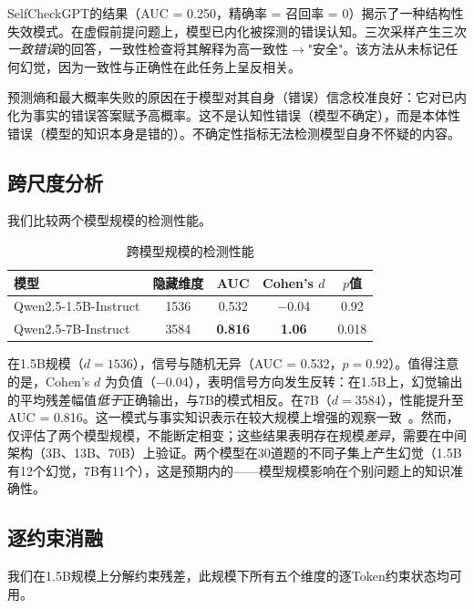 \documentclass[11pt]{ctexart}
\begin{document}
SelfCheckGPT的结果（AUC = 0.250，精确率 = 召回率 = 0）揭示了一种结构性失效模式。在虚假前提问题上，模型已内化被探测的错误认知。三次采样产生三次\textit{一致错误}的回答，一致性检查将其解释为高一致性$\rightarrow$"安全"。该方法从未标记任何幻觉，因为一致性与正确性在此任务上呈反相关。

预测熵和最大概率失败的原因在于模型对其自身（错误）信念校准良好：它对已内化为事实的错误答案赋予高概率。这不是认知性错误（模型不确定），而是本体性错误（模型的知识本身是错的）。不确定性指标无法检测模型自身不怀疑的内容。

\subsection{跨尺度分析}

我们比较两个模型规模的检测性能。

\begin{table}[h]
\centering
\caption{跨模型规模的检测性能}
\label{tab:scale}
\begin{tabular}{lcccc}
\toprule
\textbf{模型} & \textbf{隐藏维度} & \textbf{AUC} & \textbf{Cohen's $d$} & \textbf{$p$值} \\
\midrule
Qwen2.5-1.5B-Instruct & 1536 & 0.532 & $-$0.04 & 0.92 \\
Qwen2.5-7B-Instruct & 3584 & \textbf{0.816} & \textbf{1.06} & 0.018 \\
\bottomrule
\end{tabular}
\end{table}

在1.5B规模（$d = 1536$），信号与随机无异（AUC = 0.532，$p = 0.92$）。值得注意的是，Cohen's $d$ 为负值（$-$0.04），表明信号方向发生反转：在1.5B上，幻觉输出的平均残差幅值\textit{低于}正确输出，与7B的模式相反。在7B（$d = 3584$），性能提升至AUC = 0.816。这一模式与事实知识表示在较大规模上增强的观察一致~\cite{wei2022emergent}。然而，仅评估了两个模型规模，不能断定相变；这些结果表明存在规模\textit{差异}，需要在中间架构（3B、13B、70B）上验证。两个模型在30道题的不同子集上产生幻觉（1.5B有12个幻觉，7B有11个），这是预期内的——模型规模影响在个别问题上的知识准确性。

\subsection{逐约束消融}

我们在1.5B规模上分解约束残差，此规模下所有五个维度的逐Token约束状态均可用。
\end{document}
